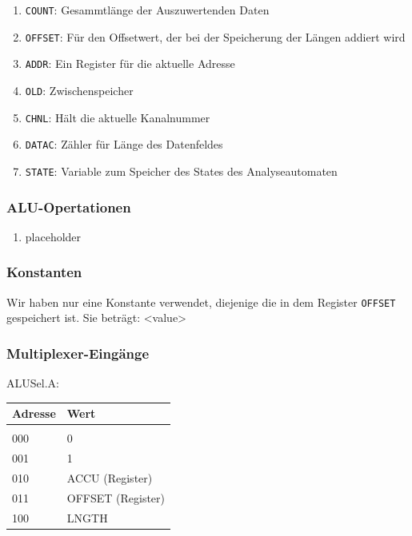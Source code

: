 \documentclass[12pt,titlepage]{article}
\begin{document}
\begin{enumerate}
\item \texttt{COUNT}: Gesammtl{\"a}nge der Auszuwertenden Daten
\item \texttt{OFFSET}: F{\"u}r den Offsetwert, der bei der Speicherung der Längen addiert wird
\item \texttt{ADDR}: Ein Register f{\"u}r die aktuelle Adresse
\item \texttt{OLD}: Zwischenspeicher
\item \texttt{CHNL}: Hält die aktuelle Kanalnummer
\item \texttt{DATAC}: Zähler für Länge des Datenfeldes
\item \texttt{STATE}: Variable zum Speicher des States des Analyseautomaten
\end{enumerate}

\subsubsection{ALU-Opertationen}

\begin{enumerate}
\item placeholder
\end{enumerate}

\subsubsection{Konstanten}
Wir haben nur eine Konstante verwendet, diejenige die in dem Register \texttt{OFFSET} gespeichert ist. Sie beträgt: <value>

\subsubsection{Multiplexer-Eingänge}

ALUSel.A:

\begin{table}
    \begin{tabular}{l|l}
    Adresse & Wert              \\
    \hline  					\\
    000     & 0                 \\
    001     & 1                 \\
    010     & ACCU (Register)   \\
    011     & OFFSET (Register) \\
    100     & LNGTH             \\
    \end{tabular}
\end{table}
\end{document}
